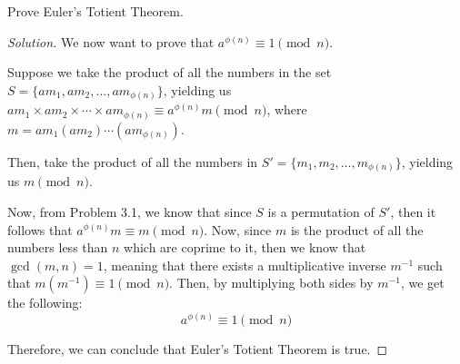 \documentclass{article}
\newenvironment{solution}{\begin{proof}[Solution]}{\end{proof}}
\begin{document}
\begin{hw}
	Prove Euler's Totient Theorem.
\end{hw}
\begin{solution}
	We now want to prove that $a^{\phi(n)} \equiv 1 \pmod{n}$.
	
	Suppose we take the product of all the numbers in the set $S = \{am_1, am_2, \ldots, am_{\phi(n)}\}$, yielding us $am_{1} \times am_{2} \times \cdots \times am_{\phi(n)} \equiv a^{\phi(n)}m \pmod{n}$, where $m = am_{1}(am_{2})\cdots(am_{\phi(n)})$.
	
	Then, take the product of all the numbers in $S' = \{m_1, m_2, \ldots, m_{\phi(n)}\}$, yielding us $m \pmod{n}$.
	
	Now, from Problem 3.1, we know that since $S$ is a permutation of $S'$, then it follows that $a^{\phi(n)}m \equiv m \pmod{n}$. Now, since $m$ is the product of all the numbers less than $n$ which are coprime to it, then we know that $\gcd(m,n) = 1$, meaning that there exists a multiplicative inverse $m^{-1}$ such that $m(m^{-1}) \equiv 1 \pmod{n}$. Then, by multiplying both sides by $m^{-1}$, we get the following:
	\begin{equation*}
		a^{\phi(n)} \equiv 1 \pmod{n}
	\end{equation*}

	Therefore, we can conclude that Euler's Totient Theorem is true.
\end{solution}

\newpage
\end{document}
